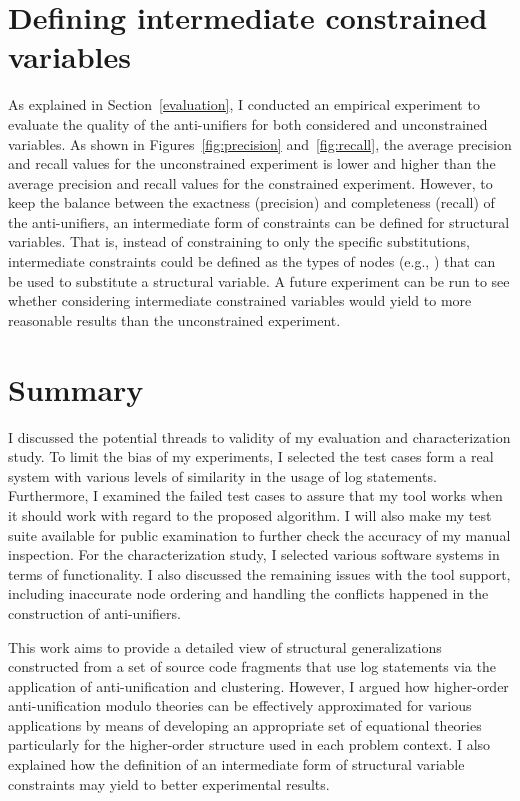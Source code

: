 \section{Defining intermediate constrained variables}  \label{intC}
As explained in Section~\ref{evaluation}, I conducted an empirical experiment to evaluate the quality of the anti-unifiers for both considered and unconstrained variables. As shown in Figures~\ref{fig:precision} and~\ref{fig:recall}, the average precision and recall values for the unconstrained experiment is lower and higher than the average precision and recall values for the constrained experiment. However, to keep the balance between the exactness (precision) and completeness (recall) of the anti-unifiers, an intermediate form of constraints can be defined for structural variables. That is, instead of constraining to only the specific substitutions, intermediate constraints could be defined as the types of nodes (e.g.,  ) that can be used to substitute a structural variable. A future experiment can be run to see whether considering intermediate constrained variables would yield to more reasonable results than the unconstrained experiment.


\section{Summary}  \label{diss-summary}
I discussed the potential threads to validity of my evaluation and characterization study. To limit the bias of my experiments, I selected the test cases form a real system with various levels of similarity in the usage of log statements. Furthermore, I examined the failed test cases to assure that my tool works when it should work with regard to the proposed algorithm. I will also make my test suite available for public examination to further check the accuracy of my manual inspection. For the characterization study, I selected various software systems in terms of functionality. I also discussed the remaining issues with the tool support, including inaccurate node ordering and handling the conflicts happened in the construction of anti-unifiers.

This work aims to provide a detailed view of structural generalizations constructed from a set of source code fragments that use log statements via the application of anti-unification and clustering. However, I argued how higher-order anti-unification modulo theories can be effectively approximated for various applications by means of developing an appropriate set of equational theories particularly for the higher-order structure used in each problem context. I also explained how the definition of an intermediate form of structural variable constraints may yield to better experimental results.


